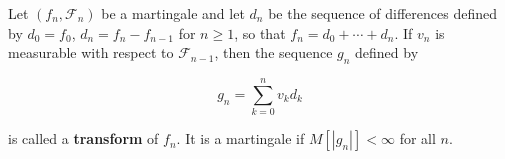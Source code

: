 Let $(f_n, \mathcal{F}_n)$ be a martingale and let $d_n$ be the sequence of differences defined by $d_0 = f_0$, $d_n = f_n - f_{n-1}$ for $n \geq 1$, so that $f_n = d_0 + \cdots + d_n$. If $v_n$ is measurable with respect to $\mathcal{F}_{n-1}$, then the sequence $g_n$ defined by

$$g_n = \sum_{k=0}^{n} v_k d_k$$

is called a \textbf{transform} of $f_n$. It is a martingale if $M[|g_n|] < \infty$ for all $n$.
